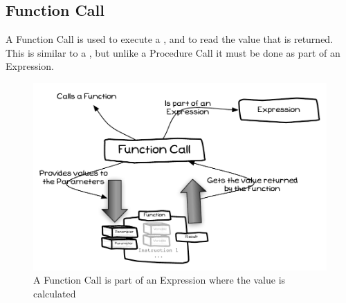 \clearpage
\subsection{Function Call} %
\label{sub:function_call}

A Function Call is used to execute a , and to read the value that is returned. This is similar to a , but unlike a Procedure Call it must be done as part of an Expression.

\begin{figure}[h]
\includegraphics[width=\textwidth]{topics/storing-using-data/diagrams/FunctionCall} 
 \caption{A Function Call is part of an Expression where the value is calculated}
 \label{fig:storing-using-data-function-call}
\end{figure}



